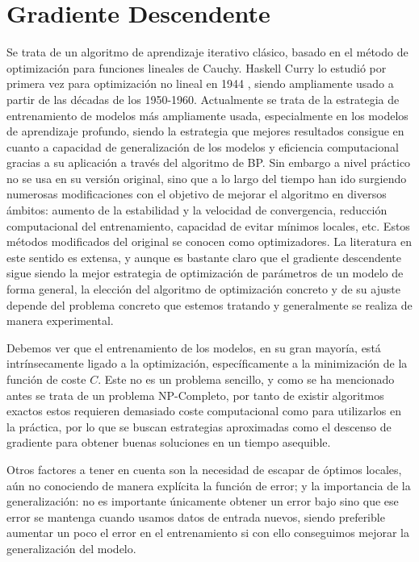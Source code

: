 \section{Gradiente Descendente}

Se trata de un algoritmo de aprendizaje iterativo clásico, basado en el método de optimización para funciones lineales de Cauchy. Haskell Curry lo estudió por primera vez para optimización no lineal en 1944 \cite{Curry1944GDNoLin}, siendo ampliamente usado a partir de las décadas de los 1950-1960. Actualmente se trata de la estrategia de entrenamiento de modelos más ampliamente usada, especialmente en los modelos de aprendizaje profundo, siendo la estrategia que mejores resultados consigue en cuanto a capacidad de generalización de los modelos y eficiencia computacional gracias a su aplicación a través del algoritmo de BP. Sin embargo a nivel práctico no se usa en su versión original, sino que a lo largo del tiempo han ido surgiendo numerosas modificaciones con el objetivo de mejorar el algoritmo en diversos ámbitos: aumento de la estabilidad y la velocidad de convergencia, reducción computacional del entrenamiento, capacidad de evitar mínimos locales, etc. Estos métodos modificados del original se conocen como optimizadores. La literatura en este sentido es extensa, y aunque es bastante claro que el gradiente descendente sigue siendo la mejor estrategia de optimización de parámetros de un modelo de forma general, la elección del algoritmo de optimización concreto y de su ajuste depende del problema concreto que estemos tratando y generalmente se realiza de manera experimental. 

Debemos ver que el entrenamiento de los modelos, en su gran mayoría, está intrínsecamente ligado a la optimización, específicamente a la minimización de la función de coste $C$. Este no es un problema sencillo, y como se ha mencionado antes se trata de un problema NP-Completo, por tanto de existir algoritmos exactos estos requieren demasiado coste computacional como para utilizarlos en la práctica, por lo que se buscan estrategias aproximadas como el descenso de gradiente para obtener buenas soluciones en un tiempo asequible. 

Otros factores a tener en cuenta son la necesidad de escapar de óptimos locales, aún no conociendo de manera explícita la función de error; y la importancia de la generalización: no es  importante únicamente obtener un error bajo sino que ese error se mantenga cuando usamos datos de entrada nuevos, siendo preferible aumentar un poco el error en el entrenamiento si con ello conseguimos mejorar la generalización del modelo.


